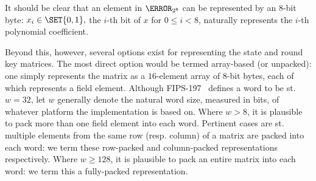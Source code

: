 
It should be clear that an element in $\F_{2^8}$ can be represented by an
$8$-bit byte: 
$
x_i \in \SET{ 0, 1 } ,
$
the $i$-th bit of $x$ for $0 \leq i < 8$, naturally represents the $i$-th 
polynomial coefficient.

Beyond this, however, several options exist for representing the state and
round key matrices.  The most direct option would be termed
 array-based (or unpacked):
one simply represents the matrix as a $16$-element array of $8$-bit bytes, 
each of which represents a field element.
Although FIPS-197~\cite{FIPS:197} defines a word to be st. $w = 32$, let
$w$ generally denote the natural word size, measured in bits, of whatever
platform the implementation is based on.
Where $w >      8$,
it is plausible to pack
more than one field element 
into each word.  
Pertinent cases are st. multiple elements from the same row (resp. column) 
of a matrix are packed into each word:
we term these
   row-packed  
and
column-packed
representations respectively.
Where $w \geq 128$, 
it is plausible to pack
an entire matrix
into each word: 
we term this a 
 fully-packed 
representation.


